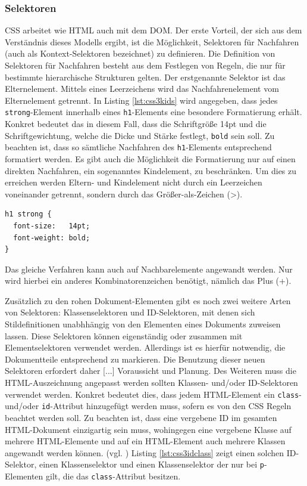\subsubsection{Selektoren} CSS arbeitet wie HTML auch mit dem DOM. \glqq Der erste Vorteil, der sich aus dem Verständnis dieses Modells ergibt, ist die Möglichkeit, Selektoren für Nachfahren (auch als Kontext-Selektoren bezeichnet) zu definieren. Die Definition von Selektoren für Nachfahren besteht aus dem Festlegen von Regeln, die nur für bestimmte hierarchische Strukturen gelten.\grqq{}\cite[S.48]{MeyeCasc2005} Der erstgenannte Selektor ist das Elternelement. Mittels eines Leerzeichens wird das Nachfahrenelement vom Elternelement getrennt. In Listing \ref{lst:css3kids} wird angegeben, dass jedes \texttt{strong}-Element innerhalb eines \texttt{h1}-Elements eine besondere Formatierung erhält. Konkret bedeutet das in diesem Fall, dass die Schriftgröße 14pt und die Schriftgewichtung, welche die Dicke und Stärke festlegt, \texttt{bold} sein soll. Zu beachten ist, dass so sämtliche Nachfahren des \texttt{h1}-Elements entsprechend formatiert werden. Es gibt auch die Möglichkeit die Formatierung nur auf einen direkten Nachfahren, ein sogenanntes Kindelement, zu beschränken. Um dies zu erreichen werden Eltern- und Kindelement nicht durch ein Leerzeichen voneinander getrennt, sondern durch das Größer-als-Zeichen (\textgreater).

\vspace{1em}
\begin{lstlisting}[language=HTML5, caption=CSS3 Selektoren für Nachfahren, label=lst:css3kids]
h1 strong {
  font-size:   14pt;
  font-weight: bold;
}
\end{lstlisting}

Das gleiche Verfahren kann auch auf Nachbarelemente angewandt werden. Nur wird hierbei ein anderes Kombinatorenzeichen benötigt, nämlich das Plus (+).\par \glqq Zusätzlich zu den rohen Dokument-Elementen gibt es noch zwei weitere Arten von Selektoren: Klassenselektoren und ID-Selektoren, mit denen sich Stildefinitionen unabhhängig von den Elementen eines Dokuments zuweisen lassen. Diese Selektoren können eigenständig oder zusammen mit Elementselektoren verwendet werden. Allerdings ist es hierfür notwendig, die Dokumentteile entsprechend zu markieren. Die Benutzung dieser neuen Selektoren erfordert daher [...] Voraussicht und Planung.\grqq{}\cite[S.34ff]{MeyeCasc2005} Des Weiteren muss die HTML-Auszeichnung angepasst werden sollten Klassen- und/oder ID-Selektoren verwendet werden. Konkret bedeutet dies, dass jedem HTML-Element ein \texttt{class}- und/oder \texttt{id}-Attribut hinzugefügt werden muss, sofern es von den CSS Regeln beachtet werden soll. Zu beachten ist, dass eine vergebene ID im gesamten HTML-Dokument einzigartig sein muss, wohingegen eine vergebene Klasse auf mehrere HTML-Elemente und auf ein HTML-Element auch mehrere Klassen angewandt werden können. (vgl. \cite{W3ScCss2014}) Listing \ref{lst:css3idclass} zeigt einen solchen ID-Selektor, einen Klassenselektor und einen Klassenselektor der nur bei \texttt{p}-Elementen gilt, die das \texttt{class}-Attribut besitzen.


